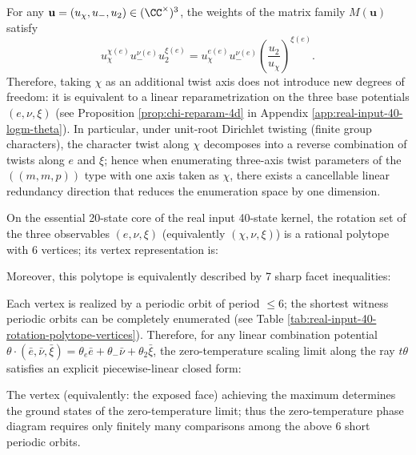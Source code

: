 \begin{corollary}\label{cor:chi-twist-dimension-reduction}
For any \(\mathbf{u}=(u_\chi,u_-,u_2)\in(\CC^\times)^3\), the weights of the matrix family \(M(\mathbf{u})\) satisfy
\[
u_\chi^{\chi(e)}u_-^{\nu(e)}u_2^{\xi(e)}
=u_\chi^{e(e)}u_-^{\nu(e)}\left(\frac{u_2}{u_\chi}\right)^{\xi(e)}.
\]
Therefore, taking \(\chi\) as an additional twist axis does not introduce new degrees of freedom: it is equivalent to a linear reparametrization on the three base potentials \((e,\nu,\xi)\) (see Proposition \ref{prop:chi-reparam-4d} in Appendix \ref{app:real-input-40-logm-theta}).
In particular, under unit-root Dirichlet twisting (finite group characters), the character twist along \(\chi\) decomposes into a reverse combination of twists along \(e\) and \(\xi\); hence when enumerating three-axis twist parameters of the \(((m,m,p))\) type with one axis taken as \(\chi\), there exists a cancellable linear redundancy direction that reduces the enumeration space by one dimension.
\end{corollary}

\begin{theorem}\label{thm:real-input-40-rotation-polytope-6v}
On the essential 20-state core of the real input 40-state kernel, the rotation set of the three observables \((e,\nu,\xi)\) (equivalently \((\chi,\nu,\xi)\)) is a rational polytope with 6 vertices; its vertex representation is:

Moreover, this polytope is equivalently described by 7 sharp facet inequalities:

Each vertex is realized by a periodic orbit of period \(\le 6\); the shortest witness periodic orbits can be completely enumerated (see Table \ref{tab:real-input-40-rotation-polytope-vertices}).
Therefore, for any linear combination potential \(\theta\cdot(\bar e,\bar\nu,\bar\xi)=\theta_e\bar e+\theta_-\bar\nu+\theta_2\bar\xi\), the zero-temperature scaling limit along the ray \(t\theta\) satisfies an explicit piecewise-linear closed form:

The vertex (equivalently: the exposed face) achieving the maximum determines the ground states of the zero-temperature limit; thus the zero-temperature phase diagram requires only finitely many comparisons among the above 6 short periodic orbits.
\end{theorem}

